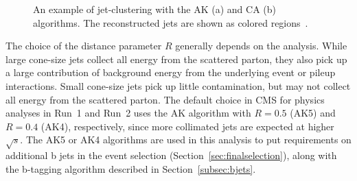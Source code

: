 
\begin{figure}[!htb]
\centering
{}
\caption{An example of jet-clustering with the AK (a) and CA (b) algorithms. The reconstructed jets are shown as colored regions~\cite{Cacciari:2008gp}.}
\label{fig:jetalgos}
\end{figure}

The choice of the distance parameter $R$ generally depends on the analysis. While large cone-size jets collect all energy from the scattered parton, they also pick up a large contribution of background energy from the underlying event or pileup interactions. Small cone-size jets pick up little contamination, but may not collect all energy from the scattered parton. 
The default choice in CMS for physics analyses in Run~1 and Run~2 uses the AK algorithm with $R = 0.5$ (AK5) and $R = 0.4$ (AK4), respectively, since more collimated jets are expected at higher $\sqrt{s}$. The AK5 or AK4 algorithms are used in this analysis to put requirements on additional b jets in the event selection (Section~\ref{sec:finalselection}), along with the b-tagging algorithm described in Section~\ref{subsec:bjets}.

